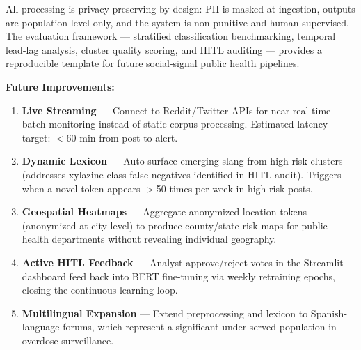 \documentclass[10pt,twocolumn]{article}
\begin{document}
All processing is privacy-preserving by design: PII is masked at ingestion, outputs are population-level only, and the system is non-punitive and human-supervised. The evaluation framework — stratified classification benchmarking, temporal lead-lag analysis, cluster quality scoring, and HITL auditing — provides a reproducible template for future social-signal public health pipelines.

\medskip
\noindent\textbf{Future Improvements:}
\begin{enumerate}[leftmargin=*, noitemsep, topsep=2pt]
  \item \textbf{Live Streaming} — Connect to Reddit/Twitter APIs for near-real-time batch monitoring instead of static corpus processing. Estimated latency target: $<$60 min from post to alert.
  \item \textbf{Dynamic Lexicon} — Auto-surface emerging slang from high-risk clusters (addresses xylazine-class false negatives identified in HITL audit). Triggers when a novel token appears $>$50 times per week in high-risk posts.
  \item \textbf{Geospatial Heatmaps} — Aggregate anonymized location tokens (anonymized at city level) to produce county/state risk maps for public health departments without revealing individual geography.
  \item \textbf{Active HITL Feedback} — Analyst approve/reject votes in the Streamlit dashboard feed back into BERT fine-tuning via weekly retraining epochs, closing the continuous-learning loop.
  \item \textbf{Multilingual Expansion} — Extend preprocessing and lexicon to Spanish-language forums, which represent a significant under-served population in overdose surveillance.
\end{enumerate}

\end{document}
